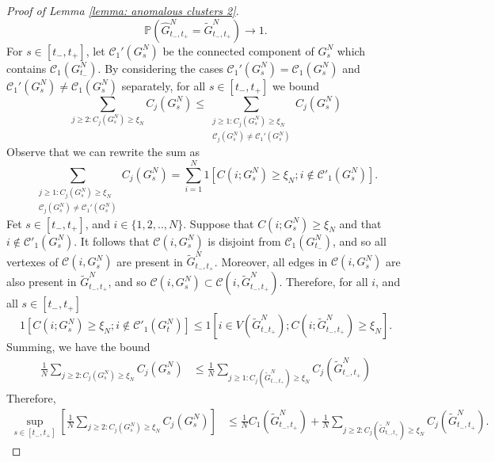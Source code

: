 \begin{proof}[Proof of Lemma \ref{lemma: anomalous clusters 2}]
\begin{equation}
    \mathbb{P}\left(\widehat{G}^N_{t_-, t_+}=\widetilde{G}^N_{t_-, t_+}\right)\rightarrow 1.
\end{equation} For $s\in [t_-, t_+]$, let $\mathcal{C}_1'(G^N_s)$ be the connected component of $G^N_s$ which contains $\mathcal{C}_1(G^N_{t_-})$. By considering the cases $\mathcal{C}_1'(G^N_s)=\mathcal{C}_1(G^N_s)$ and $\mathcal{C}_1'(G^N_s)\neq \mathcal{C}_1(G^N_s)$ separately, for all $s\in[t_-,t_+]$ we bound \begin{equation}
    \sum_{j\geq 2: C_j(G^N_s)\geq \xi_N} C_j(G^N_s) \leq \sum_{\substack{j\geq 1: C_j(G^N_s)\geq \xi_N \\[1ex] \mathcal{C}_j(G^N_s)\neq \mathcal{C}_1'(G^N_s)}} C_j(G^N_s)
\end{equation} Observe that we can rewrite the sum as \begin{equation}
    \sum_{\substack{j\geq 1: C_j(G^N_s)\geq \xi_N \\[1ex] \mathcal{C}_j(G^N_s)\neq \mathcal{C}_1'(G^N_s)}}  C_j(G^N_s) = \sum_{i=1}^N 1[C(i; G^N_s)\geq \xi_N; i \not \in \mathcal{C}'_1(G^N_s)].
\end{equation}  Fet $s\in [t_-, t_+]$, and $i\in\{1, 2,..,N\}$. Suppose that $C(i; G^N_s)\geq \xi_N$ and that $i \not \in \mathcal{C}'_1(G^N_s)$. It follows that $\mathcal{C}(i, G^N_s)$ is disjoint from $\mathcal{C}_1(G^N_{t_-})$, and so all vertexes of $\mathcal{C}(i, G^N_s)$ are present in $\widetilde{G}^N_{t_-,t_+}$. Moreover, all edges in $\mathcal{C}(i, G^N_s)$ are also present in $\widetilde{G}^N_{t_-,t_+}$, and so $\mathcal{C}(i, G^N_s) \subset \mathcal{C}(i, \widetilde{G}^N_{t_-,t_+})$. Therefore, for all $i$, and all $s\in [t_-, t_+]$ \begin{equation}
    1[C(i; G^N_s)\geq \xi_N; i \not \in \mathcal{C}'_1(G^N_t)] \leq 1[i \in V(\widetilde{G}^N_{t_-t_+}); C(i; \widetilde{G}^N_{t_-,t_+})\geq \xi_N].
\end{equation} Summing, we have the bound \begin{equation}\begin{split}
\frac{1}{N}\sum_{j\geq 2: C_j(G^N_s)\geq \xi_N} C_j(G^N_s) & \leq \frac{1}{N}\sum_{j\geq 1: C_j(\widetilde{G}^N_{t_-,t_+})\geq \xi_N} C_j(\widetilde{G}^N_{t_-,t_+}) 
\end{split} \end{equation} Therefore, \begin{equation}\begin{split}
    \sup_{s\in [t_-, t_+]} \left[\frac{1}{N}\sum_{j\geq 2: C_j(G^N_s)\geq \xi_N} C_j(G^N_s)\right] & \leq \frac{1}{N}C_1(\widetilde{G}^N_{t_-, t_+})+\frac{1}{N}\sum_{j\geq 2: C_j(\widetilde{G}^N_{t_-,t_+})\geq \xi_N} C_j(\widetilde{G}^N_{t_-,t_+}).

\end{split}
\end{equation}
\end{proof}
